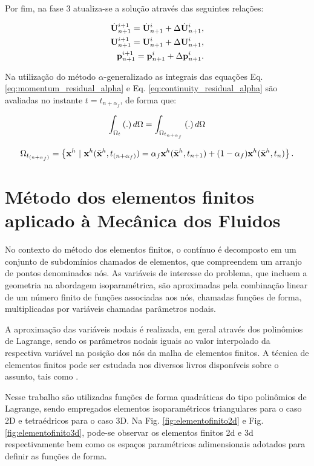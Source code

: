\documentclass[tese_patricia]{subfiles}%
\begin{document}
Por fim, na fase 3 atualiza-se a solução através das seguintes relações:

\begin{align}
\dot{\mathbf{U}}_{n+1}^{i+1} = \dot{\mathbf{U}}_{n+1}^{i} + \Delta\dot{\mathbf{U}}_{n+1}^{i},\label{update1} \\ 
\mathbf{U}_{n+1}^{i+1} = \mathbf{U}_{n+1}^{i} + \Delta\mathbf{U}_{n+1}^{i},\label{update2}\\
\mathbf{p}_{n+1}^{i+1} = \mathbf{p}_{n+1}^{i} + \Delta\mathbf{p}_{n+1}^{i}.\label{update3}
\end{align}

Na utilização do método $\alpha$-generalizado as integrais das equações Eq. \eqref{eq:momentum_residual_alpha} e Eq. \eqref{eq:continuity_residual_alpha} são avaliadas no instante $t = t_{n+\alpha_{f}}$, de forma que:

\begin{align}
\int_{\Omega_{t}} \left(.\right) d\Omega = \int_{\Omega_{t_{n+\alpha_{f}}}} \left(.\right) d\Omega
\end{align}

\begin{align}
\Omega_{t_{(n+\alpha_f)}} = \left\{\mathbf{x}^h \  |\  \mathbf{x}^h(\bar{\mathbf{x}}^h,t_{(n+\alpha_f)}) = \alpha_f \mathbf{x}^h(\bar{\mathbf{x}}^h,t_{n+1}) + (1-\alpha_f) \mathbf{x}^h(\bar{\mathbf{x}}^h,t_n)  \right\}.
\end{align}

\section{Método dos elementos finitos aplicado à Mecânica dos Fluidos}


No contexto do método dos elementos finitos, o contínuo é decomposto em um conjunto de subdomínios chamados de elementos, que compreendem um arranjo de pontos denominados nós. As variáveis de interesse do problema, que incluem a geometria na abordagem isoparamétrica, são aproximadas pela combinação linear de um número finito de funções associadas aos nós, chamadas funções de forma, multiplicadas por variáveis chamadas parâmetros nodais.

A aproximação das variáveis nodais é realizada, em geral através dos polinômios de Lagrange, sendo os parâmetros nodais iguais ao valor interpolado da respectiva variável na posição dos nós da malha de elementos finitos. A técnica de elementos finitos pode ser estudada nos diversos livros disponíveis sobre o assunto, tais como .

Nesse trabalho são utilizadas funções de forma quadráticas do tipo polinômios de Lagrange, sendo empregados elementos isoparamétricos triangulares para o caso 2D e tetraédricos para o caso 3D. Na Fig. \ref{fig:elementofinito2d} e Fig. \ref{fig:elementofinito3d}, pode-se observar os elementos finitos 2d e 3d respectivamente bem como os espaços paramétricos adimensionais adotados para definir as funções de forma. 
\end{document}
